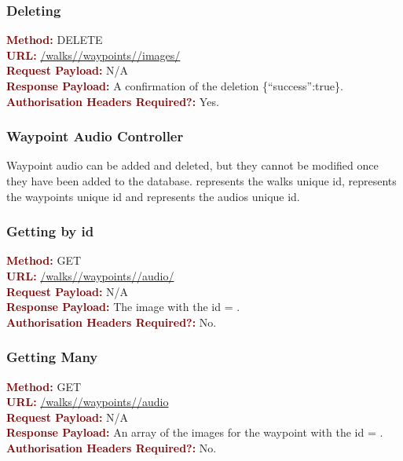 \documentclass[11pt,a4paper]{report}
\begin{document}
\subsubsection{Deleting}
\textbf{\textcolor{Maroon}{Method:}} DELETE\\
\textbf{\textcolor{Maroon}{URL:}} \url{/walks/}\url{/waypoints/}\url{/images/}\\
\textbf{\textcolor{Maroon}{Request Payload:}} N/A\\
\textbf{\textcolor{Maroon}{Response Payload:}} A confirmation of the deletion \{``success'':true\}.\\
\textbf{\textcolor{Maroon}{Authorisation Headers Required?:}} Yes.


\subsubsection{Waypoint Audio Controller}
Waypoint audio can be added and deleted, but they cannot be modified once they have been added to the database.  represents the walks unique id,  represents the waypoints unique id and  represents the audios unique id. 

\subsubsection{Getting by id}
\textbf{\textcolor{Maroon}{Method:}} GET\\
\textbf{\textcolor{Maroon}{URL:}} \url{/walks/}\url{/waypoints/}\url{/audio/}\\
\textbf{\textcolor{Maroon}{Request Payload:}} N/A\\
\textbf{\textcolor{Maroon}{Response Payload:}} The image with the id = .\\
\textbf{\textcolor{Maroon}{Authorisation Headers Required?:}} No.

\subsubsection{Getting Many}
\textbf{\textcolor{Maroon}{Method:}} GET\\
\textbf{\textcolor{Maroon}{URL:}} \url{/walks/}\url{/waypoints/}\url{/audio}\\
\textbf{\textcolor{Maroon}{Request Payload:}} N/A\\
\textbf{\textcolor{Maroon}{Response Payload:}} An array of the images for the waypoint with the id = .\\
\textbf{\textcolor{Maroon}{Authorisation Headers Required?:}} No.
\end{document}
